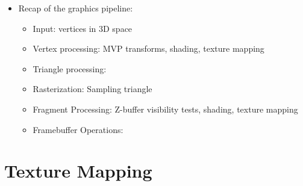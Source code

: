 \documentclass{article}
\begin{document}
\begin{itemize}
\begin{itemize}
\begin{itemize}
        \end{itemize}
        
    \end{itemize}
    
    \item Recap of the graphics pipeline:
    \begin{itemize}
        \item Input: vertices in 3D space
        \item Vertex processing: MVP transforms, shading, texture mapping
        \item Triangle processing:
        \item Rasterization: Sampling triangle
        \item Fragment Processing: Z-buffer visibility tests, shading, texture mapping
        \item Framebuffer Operations:
    \end{itemize}
\end{itemize}

\section{Texture Mapping}
\end{document}
